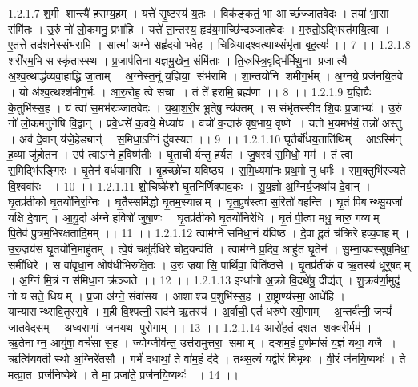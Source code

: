 1.2.1.7
श॒मी शान्त्यै॑ हराम्य॒हम् । यत्ते॑ सृ॒ष्टस्य॑ य॒तः । विक॑ङ्कतं॒ भा आर्च्छज्जातवेदः । तया॑ भा॒सा संमि॑तः । उ॒रुं नो॑ लो॒कमनु॒ प्रभा॑हि । यत्ते॑ ता॒न्तस्य॒ हृद॑य॒माच्छि॑न्दञ्जातवेदः । म॒रुतो॒ऽद्भिस्त॑मयि॒त्वा । ए॒तत्ते॒ तद॑श॒नेस्संभ॑रामि । सात्मा॑ अग्ने॒ सहृ॑दयो भवे॒ह । चित्रि॑यादश्व॒त्थाथ्संभृ॑ता बृह॒त्यः॑ ।। 7 ।।
1.2.1.8
शरी॑रम॒भि सस्कृ॑तास्स्थ । प्र॒जाप॑तिना यज्ञमु॒खेन॒ संमि॑ताः । ति॒स्रस्त्रि॒वृद्भि॑र्मिथु॒ना प्रजात्यै । अ॒श्व॒त्थाद्ध॑व्यवा॒हाद्धि जा॒ताम् । अ॒ग्नेस्त॒नूं य॒ज्ञिया॒॒ संभ॑रामि । शा॒न्तयो॑नि शमीग॒र्भम् । अ॒ग्नये॒ प्रज॑नयि॒तवे । यो अ॑श्व॒त्थश्श॑मीग॒र्भः । आ॒रु॒रोह॒ त्वे सचा । तं ते॑ हरामि॒ ब्रह्म॑णा ।। 8 ।।
1.2.1.9
य॒ज्ञियैः के॒तुभि॑स्स॒ह । यं त्वा॑ स॒मभ॑रञ्जातवेदः । य॒था॒श॒री॒रं भू॒तेषु॒ न्य॑क्तम् । स संभृ॑तस्सीद शि॒वः प्र॒जाभ्यः॑ । उ॒रुं नो॑ लो॒कमनु॑नेषि वि॒द्वान् । प्रवे॒धसे॑ क॒वये॒ मेध्या॑य । वचो॑ व॒न्दारु॑ वृष॒भाय॒ वृष्णे । यतो॑ भ॒यमभ॑यं॒ तन्नो॑ अस्तु । अव॑ दे॒वान् य॑जे॒हेड्यान्॑ । स॒मिधा॒ऽग्निं दु॑वस्यत ।। 9 ।।
1.2.1.10
घृ॒तैर्बो॑धय॒ताति॑थिम् । आऽस्मि॑न् ह॒व्या जु॑होतन । उप॑ त्वाऽग्ने ह॒विष्म॑तीः । घृ॒ताचीर्यन्तु हर्यत । जु॒षस्व॑ स॒मिधो॒ मम॑ । तं त्वा॑ स॒मिद्भि॑रङ्गिरः । घृ॒तेन॑ वर्धयामसि । बृ॒हच्छो॑चा यविष्ठ्य । स॒मि॒ध्यमा॑नः प्रथ॒मो नु धर्मः॑ । सम॒क्तुभि॑रज्यते वि॒श्ववा॑रः ।। 10 ।।
1.2.1.11
शो॒चिष्के॑शो घृ॒तनि॑र्णिक्पाव॒कः । सु॒य॒ज्ञो अ॒ग्निर्य॒जथा॑य दे॒वान् । घृ॒तप्र॑तीको घृ॒तयो॑निर॒ग्निः । घृ॒तैस्समि॑द्धो घृ॒तम॒स्यान्नम् । घृ॒त॒प्रुष॑स्त्वा स॒रितो॑ वहन्ति । घृ॒तं पिबन्थ्सु॒यजा॑ यक्षि दे॒वान् । आ॒यु॒र्दा अ॑ग्ने ह॒विषो॑ जुषा॒णः । घृ॒तप्र॑तीको घृ॒तयो॑निरेधि । घृ॒तं पी॒त्वा मधु॒ चारु॒ गव्यम् । पि॒तेव॑ पु॒त्रम॒भिर॑क्षतादि॒मम् ।। 11 ।।
1.2.1.12
त्वाम॑ग्ने समिधा॒नं य॑विष्ठ । दे॒वा दू॒तं च॑क्रिरे हव्य॒वाहम् । उ॒रु॒ज्रय॑सं घृ॒तयो॑नि॒माहु॑तम् । त्वे॒षं चक्षु॑र्दधिरे चोद॒यन्व॑ति । त्वाम॑ग्ने प्र॒दिव॒ आहु॑तं घृ॒तेन॑ । सु॒म्ना॒यव॑स्सुष॒मिधा॒ समी॑धिरे । स वा॑वृधा॒न ओष॑धीभिरुक्षि॒तः । उ॒रु ज्रया॑सि॒ पार्थि॑वा॒ विति॑ष्ठसे । घृ॒तप्र॑तीकं व ऋ॒तस्य॑ धूर्॒षदम् । अ॒ग्निं मि॒त्रं न स॑मिधा॒न ऋ॑ञ्जते ।। 12 ।।
1.2.1.13
इन्धा॑नो अ॒क्रो वि॒दथे॑षु॒ दीद्य॑त् । शु॒क्रव॑र्णा॒मुदु॑ नो यसते॒ धियम् । प्र॒जा अ॑ग्ने॒ संवा॑सय । आशाश्च प॒शुभि॑स्स॒ह । रा॒ष्ट्राण्य॑स्मा॒ आधे॑हि । यान्यासन्थ्सवि॒तुस्स॒वे । म॒ही वि॒श्पत्नी॒ सद॑ने ऋ॒तस्य॑ । अ॒र्वाची॒ एतं॑ धरुणे रयी॒णाम् । अ॒न्तर्व॑त्नी॒ जन्यं॑ जा॒तवे॑दसम् । अ॒ध्व॒राणां जनयथ पुरो॒गाम् ।। 13 ।।
1.2.1.14
आरो॑हतं द॒शत॒॒ शक्व॑री॒र्मम॑ । ऋ॒तेनाग्न॒ आयु॑षा॒ वर्च॑सा स॒ह । ज्योग्जीव॑न्त॒ उत्त॑रामुत्तरा॒॒ समाम् । दऱ्श॑म॒हं पू॒र्णमा॑सं य॒ज्ञं यथा॒ यजै । ऋत्वि॑यवती स्थो अ॒ग्निरे॑तसौ । गर्भं॑ दधाथां॒ ते वा॑म॒हं द॑दे । तथ्स॒त्यं यद्वी॒रं बि॑भृथः । वी॒रं ज॑नयि॒ष्यथः॑ । ते मत्प्रा॒त प्रज॑निष्येथे । ते मा॒ प्रजा॑ते॒ प्रज॑नयि॒ष्यथः॑ ।। 14 ।।
